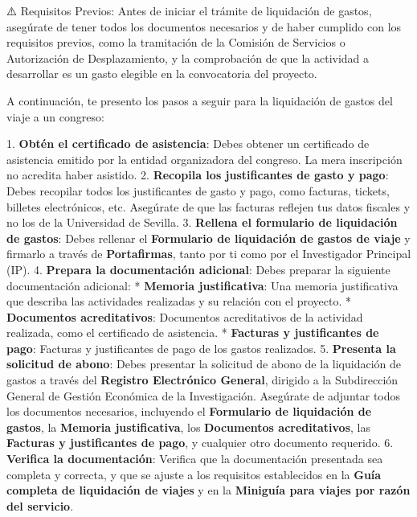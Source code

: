 \documentclass{article}
\begin{document}
\begin{itemize}
\begin{itemize}
                ⚠️ Requisitos Previos:
                Antes de iniciar el trámite de liquidación de gastos, asegúrate de tener todos los documentos necesarios y de haber cumplido con los requisitos previos, como la tramitación de la Comisión de Servicios o Autorización de Desplazamiento, y la comprobación de que la actividad a desarrollar es un gasto elegible en la convocatoria del proyecto.

                A continuación, te presento los pasos a seguir para la liquidación de gastos del viaje a un congreso:

                1. \textbf{Obtén el certificado de asistencia}: Debes obtener un certificado de asistencia emitido por la entidad organizadora del congreso. La mera inscripción no acredita haber asistido.
                2. \textbf{Recopila los justificantes de gasto y pago}: Debes recopilar todos los justificantes de gasto y pago, como facturas, tickets, billetes electrónicos, etc. Asegúrate de que las facturas reflejen tus datos fiscales y no los de la Universidad de Sevilla.
                3. \textbf{Rellena el formulario de liquidación de gastos}: Debes rellenar el \textbf{Formulario de liquidación de gastos de viaje} y firmarlo a través de \textbf{Portafirmas}, tanto por ti como por el Investigador Principal (IP).
                4. \textbf{Prepara la documentación adicional}: Debes preparar la siguiente documentación adicional:
                * \textbf{Memoria justificativa}: Una memoria justificativa que describa las actividades realizadas y su relación con el proyecto.
                * \textbf{Documentos acreditativos}: Documentos acreditativos de la actividad realizada, como el certificado de asistencia.
                * \textbf{Facturas y justificantes de pago}: Facturas y justificantes de pago de los gastos realizados.
                5. \textbf{Presenta la solicitud de abono}: Debes presentar la solicitud de abono de la liquidación de gastos a través del \textbf{Registro Electrónico General}, dirigido a la Subdirección General de Gestión Económica de la Investigación. Asegúrate de adjuntar todos los documentos necesarios, incluyendo el \textbf{Formulario de liquidación de gastos}, la \textbf{Memoria justificativa}, los \textbf{Documentos acreditativos}, las \textbf{Facturas y justificantes de pago}, y cualquier otro documento requerido.
                6. \textbf{Verifica la documentación}: Verifica que la documentación presentada sea completa y correcta, y que se ajuste a los requisitos establecidos en la \textbf{Guía completa de liquidación de viajes} y en la \textbf{Miniguía para viajes por razón del servicio}.


\end{itemize}
\end{itemize}
\end{document}
